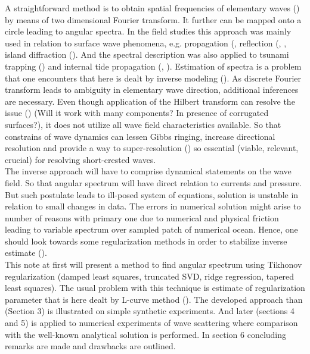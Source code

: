 A straightforward method is to obtain spatial frequencies of elementary waves (\cite{barber1963directional}) by means of two dimensional Fourier transform. It further can be mapped onto a circle leading to angular spectra. In the field studies this approach was mainly used in relation to surface wave phenomena, e.g. propagation (\cite{munk1963directional}, reflection (\cite{dickson1995wave}, \cite{thomson2005reflection}, island diffraction (\cite{pawka1983island}). And the spectral description was also applied to tsunami trapping (\cite{romano2013wavenumber}) and internal tide propagation (\cite{hendry1977observations}, \cite{lozovatsky2003spatial}). Estimation of spectra is a problem that one encounters that here is dealt by inverse modeling (\cite{long1986inverse}). As discrete Fourier transform leads to ambiguity in elementary wave direction, additional inferences are necessary. Even though application of the Hilbert transform can resolve the issue (\cite{mercier2008reflection}) (Will it work with many components? In presence of corrugated surfaces?), it does not utilize all wave field characteristics available. So that constrains of wave dynamics can lessen Gibbs ringing, increase directional resolution and provide a way to super-resolution (\cite{kay1981spectrum}) so essential (viable, relevant, crucial) for resolving short-crested waves.\\

The inverse approach will have to comprise dynamical statements on the wave field. So that angular spectrum will have direct relation to currents and pressure. But such postulate leads to ill-posed system of equations, solution is unstable in relation to small changes in data. The errors in numerical solution might arise to number of reasons with primary one due to numerical and physical friction leading to variable spectrum over sampled patch of numerical ocean. Hence, one should look towards some regularization methods in order to stabilize inverse estimate (\cite{snieder1999inverse}).\\
This note at first will present a method to find angular spectrum using Tikhonov regularization (damped least squares, truncated SVD, ridge regression, tapered least squares). The usual problem with this technique is estimate of regularization parameter that is here dealt by L-curve method (\cite{hansen1999curve}). The developed approach than (Section 3) is illustrated on simple synthetic experiments. And later (sections 4 and 5) is applied to numerical experiments of wave scattering where comparison with the well-known analytical solution is performed. In section 6 concluding remarks are made and drawbacks are outlined.\\

